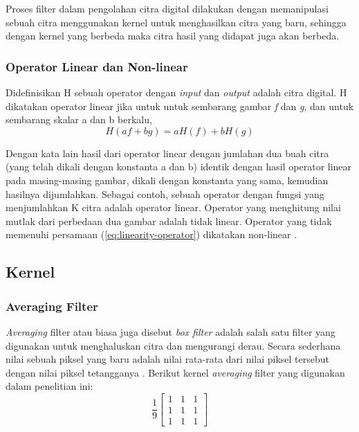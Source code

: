 Proses filter dalam pengolahan citra digital dilakukan dengan memanipulasi sebuah citra menggunakan kernel untuk menghasilkan citra yang baru, sehingga dengan kernel yang berbeda maka citra hasil yang didapat juga akan berbeda. 


\subsubsection{Operator Linear dan Non-linear}
Didefinisikan H sebuah operator dengan \textit{input} dan \textit{output} adalah citra digital. H dikatakan operator linear jika untuk untuk sembarang gambar \textit{f} dan \textit{g}, dan untuk sembarang skalar a dan b berkalu,
\begin{equation}
    \label{eq:linearity-operator}
    H(af + bg) = aH(f) + bH(g)
\end{equation}

Dengan kata lain hasil dari operator linear dengan jumlahan dua buah citra (yang telah dikali dengan konstanta a dan b) identik dengan hasil operator linear pada masing-masing gambar, dikali dengan konstanta yang sama, kemudian hasilnya dijumlahkan. Sebagai contoh, sebuah operator dengan fungsi yang menjumlahkan K citra adalah operator linear. Operator yang menghitung nilai mutlak dari perbedaan dua gambar adalah tidak linear. Operator yang tidak memenuhi persamaan (\ref{eq:linearity-operator}) dikatakan non-linear .


\subsection{Kernel}

\subsubsection{Averaging Filter}
\textit{Averaging} filter atau biasa juga disebut \textit{box filter} adalah salah satu filter yang digunakan untuk menghaluskan citra dan mengurangi derau. Secara sederhana nilai sebuah piksel yang baru adalah nilai rata-rata dari nilai piksel tersebut dengan nilai piksel tetangganya . Berikut kernel \textit{averaging} filter yang digunakan dalam penelitian ini:
\begin{equation*}
    \label{kernel:average}
    \frac{1}{9} \left[
    \begin{matrix}
        1 & 1 & 1 \\
        1 & 1 & 1 \\
        1 & 1 & 1
    \end{matrix}
    \right]
\end{equation*}

